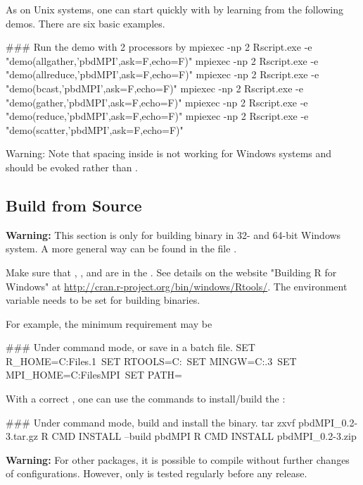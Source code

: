 As on Unix systems,
one can start quickly with  by learning from the
following demos. There are six basic examples.
\begin{Command}
### Run the demo with 2 processors by
mpiexec -np 2 Rscript.exe -e "demo(allgather,'pbdMPI',ask=F,echo=F)"
mpiexec -np 2 Rscript.exe -e "demo(allreduce,'pbdMPI',ask=F,echo=F)"
mpiexec -np 2 Rscript.exe -e "demo(bcast,'pbdMPI',ask=F,echo=F)"
mpiexec -np 2 Rscript.exe -e "demo(gather,'pbdMPI',ask=F,echo=F)"
mpiexec -np 2 Rscript.exe -e "demo(reduce,'pbdMPI',ask=F,echo=F)"
mpiexec -np 2 Rscript.exe -e "demo(scatter,'pbdMPI',ask=F,echo=F)"
\end{Command}
{\color{red}Warning:}
Note that spacing inside  is not working for Windows systems
and  should be evoked rather than .


\subsection[Build from Source]{Build from Source}
\label{sec:building_from_source}

{\color{red} \bf Warning:} This section is only for building binary in
32- and 64-bit Windows system. A more general way can be found in the file
.

Make sure that , , and  are in
the .
See details on the website "Building R for Windows" at
\url{http://cran.r-project.org/bin/windows/Rtools/}.
The environment variable 
needs to be set for building binaries.

For example, the minimum requirement may be
\begin{Command}
### Under command mode, or save in a batch file.
SET R_HOME=C:\Program Files\R{}.1\
SET RTOOLS=C:\Rtools\bin\
SET MINGW=C:\Rtools{}.3\bin\
SET MPI_HOME=C:\Program Files\Miscrosoft MPI\
SET PATH=%
\end{Command}

With a correct \code{PATH}, one can use the  commands
to install/build the \pkg{pbdMPI}:
\begin{Command}
### Under command mode, build and install the binary.
tar zxvf pbdMPI_0.2-3.tar.gz
R CMD INSTALL --build pbdMPI
R CMD INSTALL pbdMPI_0.2-3.zip
\end{Command}

{\color{red} \bf Warning:} For other  packages, it is possible
to compile without further changes of configurations. However, only
\pkg{pbdMPI} is tested regularly before any release.

